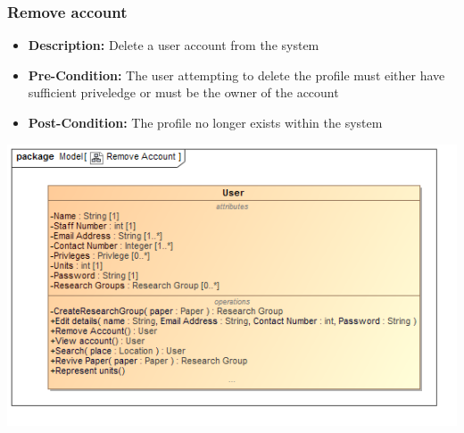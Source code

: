 \documentclass[11pt]{article}
\begin{document}
		\subsubsection{Remove account}
		\begin{itemize}
			\item \textbf{Description: }Delete a user account from the system
			\item \textbf{Pre-Condition: }The user attempting to delete the profile must either have sufficient priveledge or must be the owner of the account
			\item \textbf{Post-Condition: }The profile no longer exists within the system
		\end{itemize}
		\begin{center}
			\includegraphics[width=\textwidth]{../Diagrams/DomainModel/RemoveAccount.png}\\[0.5cm]
		\end{center}
		\newpage
\end{document}
